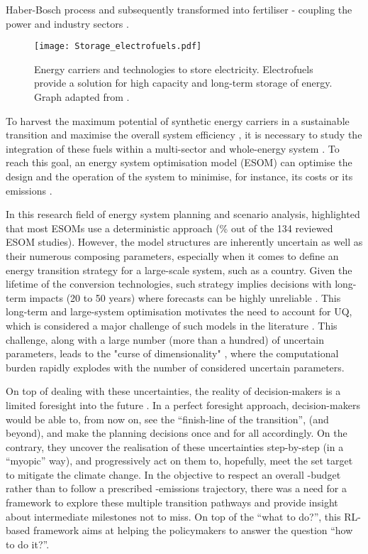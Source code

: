 Haber-Bosch process and subsequently transformed into fertiliser - coupling the power and industry sectors \cite{verleysen2020can}. 

\begin{figure}[htbp!]
\centering
\texttt{[image: Storage\_electrofuels.pdf]}
\caption{Energy carriers and technologies to store electricity. Electrofuels provide a solution for high capacity and long-term storage of energy. Graph adapted from \cite{ISPT2017}.}
\label{fig:intro:Storage_electrofuels}
\end{figure}

To harvest the maximum potential of synthetic energy carriers in a sustainable transition and maximise the overall system efficiency \cite{mathiesen2015}, it is necessary to study the integration of these fuels within a multi-sector and whole-energy system \cite{contino2020whole}. To reach this goal, an energy system optimisation model (ESOM) can optimise the design and the operation of the system to minimise, for instance, its costs or its emissions \cite{zeng2011review}. 

In this research field of energy system planning and scenario analysis, \citet{yue2018review} highlighted that most ESOMs use a deterministic approach (\% out of the 134 reviewed ESOM studies). However, the model structures are inherently uncertain as well as their numerous composing parameters, especially when it comes to define an energy transition strategy for a large-scale system, such as a country. Given the lifetime of the conversion technologies, such strategy implies decisions with long-term impacts (20 to 50 years) where forecasts can be highly unreliable \cite{Moret2017}. This long-term and large-system optimisation motivates the need to account for \gls{UQ}, which is considered a major challenge of such models in the literature \cite{pfenninger2014energy}. This challenge, along with a large number (\ie more than a hundred) of uncertain parameters, leads to the "curse of dimensionality" \cite{kuo2005lifting}, where the computational burden rapidly explodes with the number of considered uncertain parameters.

On top of dealing with these uncertainties, the reality of decision-makers is a limited foresight into the future \cite{poncelet2016myopic}. In a perfect foresight approach, decision-makers would be able to, from now on, see the ``finish-line of the transition'',  (and beyond), and make the planning decisions once and for all accordingly. On the contrary, they uncover the realisation of these uncertainties step-by-step (\ie in a ``myopic'' way), and progressively act on them to, hopefully, meet the set target to mitigate the climate change. In the objective to respect an overall -budget rather than to follow a prescribed -emissions trajectory, there was a need for a framework to explore these multiple transition pathways and provide insight about intermediate milestones not to miss. On top of the ``what to do?'', this \gls{RL}-based framework aims at helping the policymakers to answer the  question ``how to do it?''.

